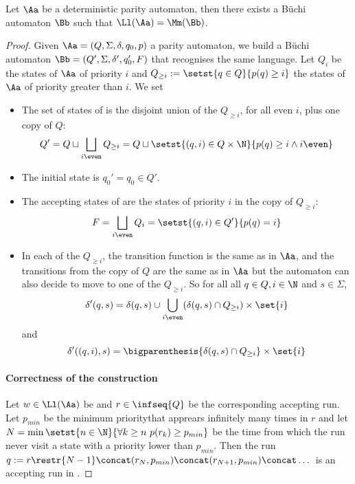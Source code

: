\begin{lemma}
    Let $\Aa$ be a deterministic parity automaton,
    then there exists a Büchi automaton $\Bb$
    such that $\Ll(\Aa) = \Mm(\Bb)$.
\end{lemma}
\begin{proof}
    Given $\Aa = (Q, \Sigma, \delta, q_0, p)$ a parity automaton,
    we build a Büchi automaton $\Bb = (Q', \Sigma, \delta', q'_0, F)$ that recognises the same language.
    Let $Q_i$ be the states of $\Aa$ of priority $i$
    and $Q_{\geq i} := \setst{q \in Q}{p(q) \geq i}$ the states of $\Aa$ of priority greater than $i$.
    We set \begin{itemize}
        \item The set of states of \Bb is the disjoint union of the $Q_{\geq i}$, for all even $i$, plus one
        copy of $Q$: \[
                Q' = Q \sqcup \bigsqcup_{i \even} Q_{\geq i} =
                Q \sqcup \setst{(q, i) \in Q \times \N}{p(q) \geq i \wedge i \even}
            \]
        \item The initial state is $q_0' = q_0 \in Q'$.
        \item The accepting states of \Bb are the states of priority $i$ in the copy of $Q_{\geq i}$:
        \[
            F = \bigsqcup_{i \even} Q_i = \setst{(q, i) \in Q'}{p(q) = i}
        \]
        \item In each of the $Q_{\geq i}$,
            the transition function is the same as in $\Aa$,
            and the transitions from the copy of $Q$ are the same as in $\Aa$ but
            the automaton can also decide to move to one of the $Q_{\geq i}$.
            So for all all $q \in Q, i \in \N$ and $s \in \Sigma$,
            \[
                \delta'(q, s) = \delta(q, s) \cup \bigcup_{i \even} (\delta(q, s) \cap Q_{\geq i})\times \set{i}
                \] and \[
                \delta'((q, i), s) = \bigparenthesis{\delta(q, s) \cap Q_{\geq i}} \times \set{i}
            \]
    \end{itemize}

    \paragraph*{Correctness of the construction} Let $w \in \Ll(\Aa)$ be and $r \in \infseq{Q}$
    be the corresponding accepting run. Let $p_{min}$ be the minimum prioritythat apprears infinitely many times
    in $r$ and let $N = \min \setst{n \in \N}{\forall k \geq n~ p(r_k) \geq p_{min}}$
    be the time from which the run never visit a state with a priority lower than $p_{min}$.
    Then the run $q := r\restr{N-1} \concat (r_N, p_{min}) \concat (r_{N+1}, p_{min}) \concat \dots$
    is an accepting run in \Bb.

\end{proof}

